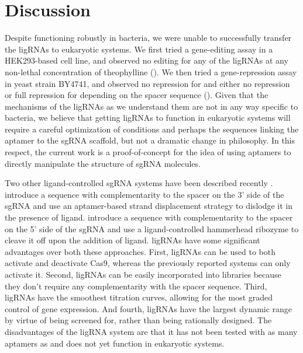 \documentclass[10pt,oneside]{article}
\begin{document}
\section{Discussion}



Despite functioning robustly in bacteria, we were unable to successfully transfer the ligRNAs to eukaryotic systems.  We first tried a gene-editing assay in a HEK293-based cell line, and observed no editing for any of the ligRNAs at any non-lethal concentration of theophylline ().  We then tried a gene-repression assay in yeast strain BY4741, and observed no repression for \ligrnaF{} and either no repression or full repression for \ligrnaB{} depending on the spacer sequence ().  Given that the mechanisms of the ligRNAs as we understand them are not in any way specific to bacteria, we believe that getting ligRNAs to function in eukaryotic systems will require a careful optimization of conditions and perhaps the sequences linking the aptamer to the sgRNA scaffold, but not a dramatic change in philosophy.  In this respect, the current work is a proof-of-concept for the idea of using aptamers to directly manipulate the structure of sgRNA molecules.


Two other ligand-controlled sgRNA systems have been described recently \autocite{liu2016,tang2017}.   introduce a sequence with complementarity to the spacer on the 3' side of the sgRNA and use an aptamer-based strand displacement strategy to dislodge it in the presence of ligand.   introduce a sequence with complementarity to the spacer on the 5' side of the sgRNA and use a ligand-controlled hammerhead ribozyme to cleave it off upon the addition of ligand.  ligRNAs have some significant advantages over both these approaches.  First, ligRNAs can be used to both activate and deactivate Cas9, whereas the previously reported systems can only activate it.  Second, ligRNAs can be easily incorporated into libraries because they don't require any complementarity with the spacer sequence.  Third, ligRNAs have the smoothest titration curves, allowing for the most graded control of gene expression.  And fourth, ligRNAs have the largest dynamic range by virtue of being screened for, rather than being rationally designed.  The disadvantages of the ligRNA system are that it has not been tested with as many aptamers as  and does not yet function in eukaryotic systems.
\end{document}

